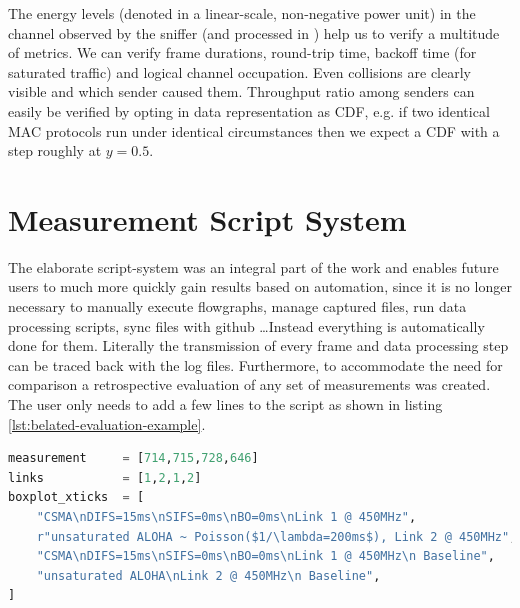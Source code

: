 The energy levels (denoted in a linear-scale, non-negative power unit) in the channel observed by the sniffer (and processed in ) help us to verify a multitude of metrics. We can verify frame durations, round-trip time, backoff time (for saturated traffic) and logical channel occupation. Even collisions are clearly visible and which sender caused them. Throughput ratio among senders can easily be verified by opting in data representation as CDF, e.g. if two identical MAC protocols run under identical circumstances then we expect a CDF with a step roughly at $y=0.5$.

\section{Measurement Script System}
\label{sec:script-system}

The elaborate script-system was an integral part of the work and enables future users to much more quickly gain results based on automation, since it is no longer necessary to manually execute flowgraphs, manage captured files, run data processing scripts, sync files with github \ldots Instead everything is automatically done for them. Literally the transmission of every frame and data processing step can be traced back with the log files. Furthermore, to accommodate the need for comparison a retrospective evaluation of any set of measurements  was created. The user only needs to add a few lines to the script as shown in listing \ref{lst:belated-evaluation-example}.
  
\begin{lstlisting}[language=Python,caption=Evaluation of measurements with \code{belated\_evaluation.py}. In \code{links} we denote the link we used in the corresponding measurement (compare figure \ref{fig:measurement-setup}),label=lst:belated-evaluation-example]
measurement     = [714,715,728,646]
links           = [1,2,1,2]
boxplot_xticks  = [
	"CSMA\nDIFS=15ms\nSIFS=0ms\nBO=0ms\nLink 1 @ 450MHz",
    r"unsaturated ALOHA ~ Poisson($1/\lambda=200ms$), Link 2 @ 450MHz",
    "CSMA\nDIFS=15ms\nSIFS=0ms\nBO=0ms\nLink 1 @ 450MHz\n Baseline",
    "unsaturated ALOHA\nLink 2 @ 450MHz\n Baseline",
]
\end{lstlisting}

